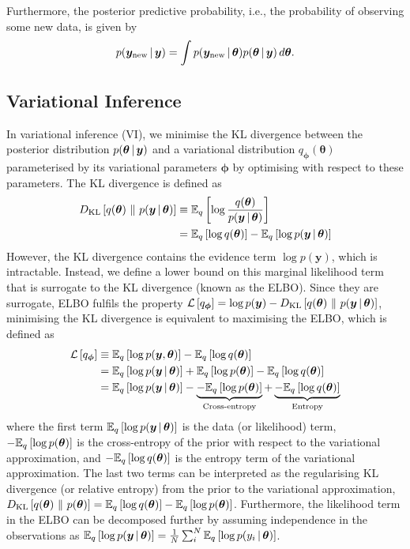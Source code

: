 \documentclass[10pt,a4paper,twocolumn]{article}
\begin{document}
Furthermore, the posterior predictive probability, i.e., the probability of observing some new data, is given by
\begin{align}
    p(\bm y_{\mathrm{new}} \, | \, \bm y) = \int p(\bm y_{\mathrm{new}} \, | \, \bm \theta) p(\bm \theta \, | \, \bm y)\,d\bm\theta.
\end{align}

\subsection{Variational Inference}

In variational inference (VI), we minimise the KL divergence between the posterior distribution \(p(\bm \theta \, | \, \bm y)\) and a variational distribution \(q_{\bm \phi}(\bm \theta)\) parameterised by its variational parameters \(\bm \phi\) by optimising with respect to these parameters.
The KL divergence is defined as
\begin{align}
    D_{\mathrm{KL}}\left[q(\bm \theta)\ \lVert\ p(\bm y \, | \, \bm \theta)\right] \equiv{}& \mathbb{E}_{q}\left[\log \frac{q(\bm \theta)}{p(\bm y \, | \, \bm \theta)}\right] \label{eq:kld}\\
    ={}& \mathbb{E}_{q}\left[\log q(\bm \theta)\right] - \mathbb{E}_{q}\left[\log p(\bm y \, | \, \bm \theta)\right] \nonumber
\end{align}
However, the KL divergence contains the evidence term \(\log p(\bm y)\), which is intractable.
Instead, we define a lower bound on this marginal likelihood term that is surrogate to the KL divergence (known as the ELBO).
Since they are surrogate, ELBO fulfils the property \(\mathcal{L}\left[q_{\bm \phi}\right] = \log p(\bm y) - D_{\mathrm{KL}}\left[q(\bm \theta)\ \lVert\ p(\bm y \, | \, \bm \theta)\right]\), minimising the KL divergence is equivalent to maximising the ELBO, which is defined as
\begin{align}
    \mathcal{L}\left[q_{\bm \phi}\right] \equiv{}& \mathbb{E}_{q}\left[\log p(\bm y, \bm \theta)\right] - \mathbb{E}_{q}\left[\log q(\bm \theta)\right] \nonumber\\
          ={}& \mathbb{E}_{q}\left[\log p(\bm y \, | \, \bm \theta)\right] + \mathbb{E}_{q}\left[\log p(\bm \theta)\right] - \mathbb{E}_{q}\left[\log q(\bm \theta)\right] \nonumber\\
  ={}& \mathbb{E}_{q}\left[\log p(\bm y \, | \, \bm \theta)\right] - \underbrace{- \mathbb{E}_{q}\left[\log p(\bm \theta)\right]}_{\text{Cross-entropy}} + \underbrace{- \mathbb{E}_{q}\left[\log q(\bm \theta)\right]}_{\text{Entropy}} \label{eq:elbo}
\end{align}
where the first term \(\mathbb{E}_{q}\left[\log p(\bm y \, | \, \bm \theta)\right]\) is the data (or likelihood) term, \(-\mathbb{E}_{q}\left[\log p(\bm \theta)\right]\) is the cross-entropy of the prior with respect to the variational approximation, and \(-\mathbb{E}_{q}\left[\log q(\bm \theta)\right]\) is the entropy term of the variational approximation.
The last two terms can be interpreted as the regularising KL divergence (or relative entropy) from the prior to the variational approximation, \(D_{\mathrm{KL}}\left[q(\bm \theta)\ \lVert\ p(\bm \theta)\right] = \mathbb{E}_{q}\left[\log q(\bm \theta)\right] - \mathbb{E}_{q}\left[\log p(\bm \theta)\right]\).
Furthermore, the likelihood term in the ELBO can be decomposed further by assuming independence in the observations as \(\mathbb{E}_{q}\left[\log p(\bm y \, | \, \bm \theta)\right] = \frac{1}{N} \sum^N_i \mathbb{E}_{q}\left[\log p(y_i \, | \, \bm \theta)\right]\).
\end{document}
